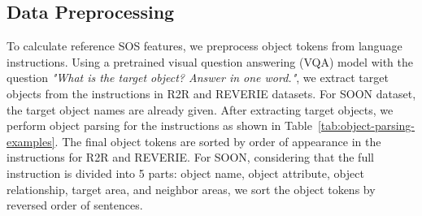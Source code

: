 \documentclass[10pt,twocolumn,letterpaper]{article}
\begin{document}
\subsection{Data Preprocessing}
To calculate reference SOS features, we preprocess object tokens from language instructions. Using a pretrained visual question answering (VQA) model \cite{antol2015vqa} with the question \textit{"What is the target object? Answer in one word."}, we extract target objects from the instructions in R2R and REVERIE datasets. For SOON dataset, the target object names are already given. After extracting target objects, we perform object parsing for the instructions as shown in Table~\ref{tab:object-parsing-examples}. The final object tokens are sorted by order of appearance in the instructions for R2R and REVERIE. For SOON, considering that the full instruction is divided into 5 parts: object name, object attribute, object relationship, target area, and neighbor areas, we sort the object tokens by reversed order of sentences.
\end{document}
